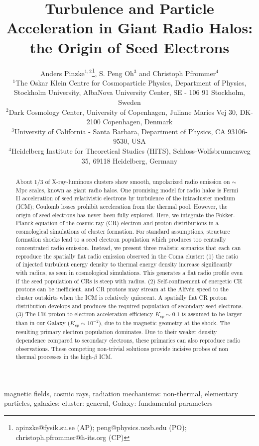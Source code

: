 \documentclass[useAMS,usenatbib]{mn2e}
\title[Origin of Seed Electrons]{Turbulence and Particle Acceleration in Giant Radio Halos: the Origin of Seed Electrons}
\author[A. Pinzke, S. Peng Oh and C. Pfrommer] 
{Anders Pinzke$^{1,2}$\thanks{apinzke@fysik.su.se (AP); peng@physics.ucsb.edu (PO); christoph.pfrommer@h-its.org (CP)}, S. Peng Oh$^{3}$ and Christoph Pfrommer$^{4}$\footnotemark[1]\\
$^{1}$The Oskar Klein Centre for Cosmoparticle Physics, Department
  of Physics, Stockholm University, AlbaNova University Center, SE - 106 91
  Stockholm, Sweden\\
$^{2}$Dark Cosmology Center, University of Copenhagen,
  Juliane Maries Vej 30, DK-2100 Copenhagen, Denmark\\
  $^{3}$University of California - Santa Barbara,
  Department of Physics, CA 93106-9530, USA\\
$^{4}$Heidelberg Institute for Theoretical Studies
  (HITS), Schloss-Wolfsbrunnenweg 35, 69118 Heidelberg, Germany}
\begin{document}
\pagerange{\pageref{firstpage}--\pageref{lastpage}} 
\maketitle
\label{firstpage}



 
\begin{abstract}
About $1/3$ of X-ray-luminous clusters show smooth, unpolarized radio
emission on $\sim$Mpc scales, known as giant radio halos. One
promising model for radio halos is Fermi II acceleration of seed
relativistic electrons by turbulence of the intracluster medium (ICM);
Coulomb losses prohibit acceleration from the thermal pool. However,
the origin of seed electrons has never been fully explored. Here, we
integrate the Fokker-Planck equation of the cosmic ray (CR) electron
and proton distributions in a cosmological simulations of cluster
formation. For standard assumptions, structure formation shocks lead
to a seed electron population which produces too centrally
concentrated radio emission. Instead, we present three realistic
scenarios that each can reproduce the spatially flat radio emission
observed in the Coma cluster: (1) the ratio of injected turbulent
energy density to thermal energy density increase significantly with
radius, as seen in cosmological simulations. This generates a flat
radio profile even if the seed population of CRs is steep with
radius. (2) Self-confinement of energetic CR protons can be
inefficient, and CR protons may stream at the Alfv{\'e}n speed to the
cluster outskirts when the ICM is relatively quiescent. A spatially
flat CR proton distribution develops and produces the required
population of secondary seed electrons. (3) The CR proton to electron
acceleration efficiency $K_{ep} \sim 0.1$ is assumed to be larger than
in our Galaxy ($K_{ep} \sim 10^{-2}$), due to the magnetic geometry at
the shock. The resulting primary electron population dominates. Due to
their weaker density dependence compared to secondary electrons, these
primaries can also reproduce radio observations.  These competing
non-trivial solutions provide incisive probes of non thermal processes
in the high-$\beta$ ICM.
\end{abstract} 

\begin{keywords}
  magnetic fields, cosmic rays, radiation mechanisms: non-thermal, elementary
  particles, galaxies: cluster: general, Galaxy: fundamental parameters
\end{keywords}
\end{document}
